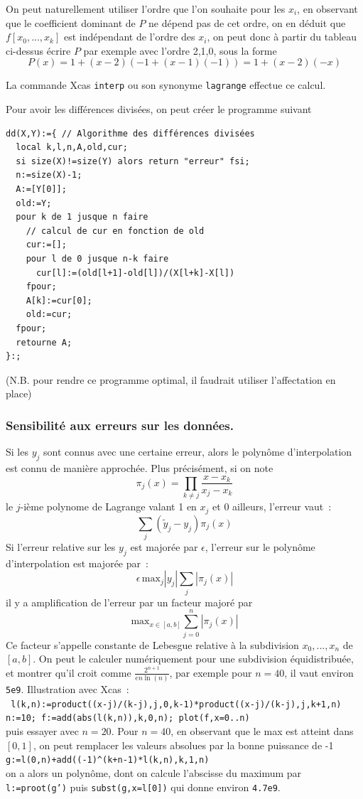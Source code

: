 \documentclass[a4paper,11pt]{article}
\begin{document}
On peut naturellement utiliser l'ordre que l'on souhaite pour les
$x_i$, en observant que le coefficient dominant de $P$ ne d\'epend pas de
cet ordre, on en d\'eduit que $f[x_0,...,x_k]$ est ind\'ependant de
l'ordre des $x_i$, on peut donc \`a partir du tableau ci-dessus
\'ecrire $P$ par exemple avec l'ordre 2,1,0, sous la forme
\[ P(x)=1+(x-2)(-1+(x-1)(-1))=1+(x-2)(-x)\]

La commande Xcas \verb|interp| ou son synonyme \verb|lagrange|
effectue ce calcul.

Pour avoir les diff\'erences divis\'ees, on peut cr\'eer le programme suivant
\begin{verbatim}
dd(X,Y):={ // Algorithme des différences divisées
  local k,l,n,A,old,cur;
  si size(X)!=size(Y) alors return "erreur" fsi;
  n:=size(X)-1;
  A:=[Y[0]];
  old:=Y;
  pour k de 1 jusque n faire
    // calcul de cur en fonction de old
    cur:=[];
    pour l de 0 jusque n-k faire
      cur[l]:=(old[l+1]-old[l])/(X[l+k]-X[l])
    fpour;
    A[k]:=cur[0];
    old:=cur;
  fpour;
  retourne A;
}:;
\end{verbatim}
(N.B. pour rendre ce programme optimal, il faudrait utiliser l'affectation en place)

\subsubsection{Sensibilit\'e aux erreurs sur les donn\'ees.}
Si les $y_j$ sont connus avec une certaine erreur, alors le polyn\^ome 
d'interpolation est connu de mani\`ere approch\'ee. Plus
pr\'ecis\'ement, si on note
$$ \pi_j(x)=\prod_{k \neq j} \frac{x-x_k}{x_j-x_k}$$
le $j$-i\`eme polynome de Lagrange valant 1 en $x_j$ et 0 ailleurs,
l'erreur vaut~:
$$ \sum_j (\tilde{y}_j-y_j) \pi_j(x) $$
Si l'erreur relative sur les $y_j$ est major\'ee par $\epsilon$,
l'erreur sur le polyn\^ome d'interpolation est major\'ee par~:
$$ \epsilon \, \mbox{max}_j|y_j| \sum_j |\pi_j(x)| $$
il y a amplification de l'erreur par un facteur major\'e par~
$$ \mbox{max}_{x \in [a,b]} \sum_{j=0}^n |\pi_j(x)| $$
Ce facteur s'appelle constante de Lebesgue relative \`a la
subdivision $x_0,...,x_n$ de $[a,b]$. On peut le calculer
num\'eriquement pour une subdivision \'equidistribu\'ee,
et montrer qu'il croit comme $\frac{2^{n+1}}{e n \ln(n)}$,
par exemple pour $n=40$, il vaut environ {\tt 5e9}.
Illustration avec Xcas~:\\
{\tt
  l(k,n):=product((x-j)/(k-j),j,0,k-1)*product((x-j)/(k-j),j,k+1,n)}\\
{\tt n:=10; f:=add(abs(l(k,n)),k,0,n); plot(f,x=0..n)}\\
puis essayer avec $n=20$. Pour $n=40$, en observant que le max
est atteint dans $[0,1]$, on peut remplacer les valeurs absolues
par la bonne puissance de -1\\
\verb|g:=l(0,n)+add((-1)^(k+n-1)*l(k,n),k,1,n)|\\
on a alors un polyn\^ome, dont on calcule l'abscisse du maximum par
{\tt l:=proot(g')} puis {\tt subst(g,x=l[0])} qui donne environ {\tt 4.7e9}.
\end{document}
